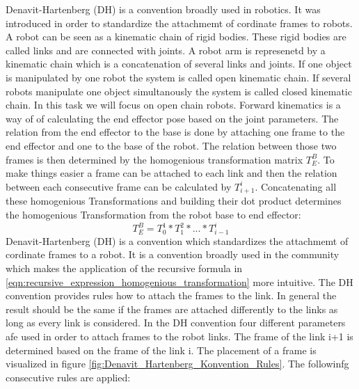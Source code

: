 \documentclass{tpk4170report}
\begin{document}
Denavit-Hartenberg (DH) is a convention broadly used in robotics. It was introduced in order to standardize the attachmemt of cordinate frames to robots. A robot can be seen as a kinematic chain of rigid bodies. These rigid bodies are called links and are connected with joints. A robot arm is represenetd by a kinematic chain which is a concatenation of several links and joints. If one object is manipulated by one robot the system is called open kinematic chain. If several robots manipulate one object simultanously the system is called closed kinematic chain. In this task we will focus on open chain robots. Forward kinematics is a way of of calculating the end effector pose based on the joint parameters. The relation from the end effector to the base is done by attaching one frame to the end effector and one to the base of the robot. The relation between those two frames is then determined by the homogenious transformation matrix \(T_{E}^{B}\). To make things easier a frame can be attached to each link and then the relation between each consecutive frame can be calculated by \(T_{i+1}^{i}\). Concatenating all these homogenious Transformations and building their dot product determines the homogenious Transformation from the robot base to end effector: 
\begin{equation}
  T_{E}^{B} = T_{0}^{1}*T_{1}^{2}* ... *T_{i-1}^{i}
  \label{eqn:recursive_expression_homogenious_transformation}
\end{equation}
Denavit-Hartenberg (DH) is a convention which standardizes the attachmemt of cordinate frames to a robot. It is a convention broadly used in the community which makes the application of the recursive formula in \ref{eqn:recursive_expression_homogenious_transformation} more intuitive. The DH convention provides rules how to attach the frames to the link. In general the result should be the same if the frames are attached differently to the links as long as every link is considered. In the DH convention four different parameters afe used in order to attach frames to the robot links. The frame of the link i+1 is determined based on the frame of the link i. The placement of a frame is visualized in figure \ref{fig:Denavit_Hartenberg_Konvention_Rules}. The followinfg consecutive rules are applied:
\end{document}
